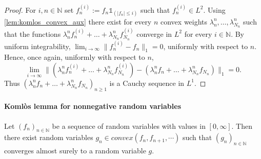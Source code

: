 \begin{proof}
  \leanok
  For $i,n\in\mathbb{N}$ set $f_{n}^{(i)}:=f_n \mathbb{1}_{(|f_n|\leq i)}$ such that $f_{n}^{(i)}\in L^2$.
  Using \ref{lem:komlos_convex_aux} there exist for every $n$ convex weights $\lambda_n^{n}, \ldots, \lambda_{N_n}^{n}$ such that the functions
  $ \lambda_n^{n} f_n^{(i)} + \ldots+\lambda_{N_n}^{n} f_{N_n}^{(i)}$ converge in $L^2$ for every $i\in\mathbb{N}$.
  By uniform integrability, $\lim_{i\to \infty}\| f^{(i)}_n- f_n\|_1=0$, uniformly with respect to $n$.
  Hence, once again, uniformly with respect to $n$,
  $$ \textstyle\lim_{i\to\infty}\|  (\lambda_n^{n} f_n^{(i)} + \ldots+\lambda_{N_n}^{n} f_{N_n}^{(i)})-(\lambda_n^{n} f_n + \ldots+\lambda_{N_n}^{n} f_{N_n})\|_1= 0.$$
  Thus $(\lambda_n^{n} f_n + \ldots+\lambda_{N_n}^{n} f_{N_n})_{n\geq 1}$  is a Cauchy sequence in $L^1$.
\end{proof}


\paragraph{Komlòs lemma for nonnegative random variables}

\begin{lemma}\label{lem:komlos_ennreal}
  \leanok
Let $(f_n)_{n\in\mathbb{N}}$ be a sequence of random variables with values in $[0, \infty]$.
Then there exist random variables $g_n \in convex( f_n, f_{n+1}, \cdots)$ such that $(g_n)_{n\in\mathbb{N}}$ converges almost surely to a random variable $g$.
\end{lemma}

